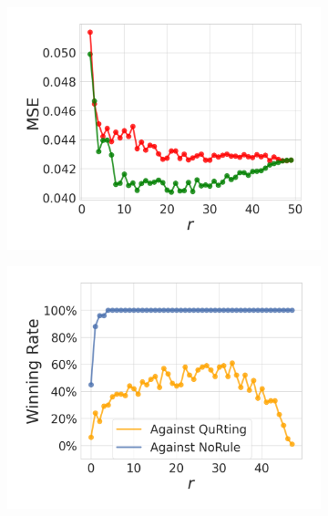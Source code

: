 \documentclass{article}
\begin{document}
\begin{figure}[h]
\begin{subfigure}{0.3\textwidth}
  \centering
  \includegraphics[width=1.0\linewidth]{figures/EvalA_IMDB_Pairwise_dpp_vs_random_MSE.pdf}
  \caption{}
  \label{fig:EvalA_IMDB_Pairwise_dpp_vs_random_MSE}
\end{subfigure}
\begin{subfigure}{0.3\textwidth}
  \centering
  \includegraphics[width=1.0\linewidth]{figures/EvalA_CommonCrawl_Pairwise_winning_rate.pdf}
  \caption{}
  \label{fig:EvalA_CommonCrawl_Pairwise_winning_rate}
\end{subfigure}
\begin{subfigure}{0.297\textwidth}
  \centering

\end{subfigure}
\end{figure}
\end{document}
